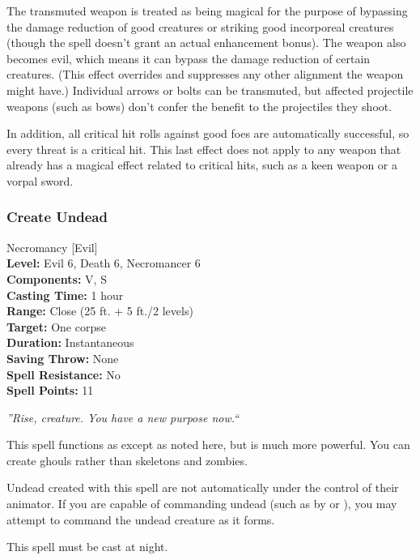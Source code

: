 The transmuted weapon is treated as being magical for the purpose of bypassing the damage reduction of good creatures or striking good incorporeal creatures (though the spell doesn't grant an actual enhancement bonus). 
The weapon also becomes evil, which means it can bypass the damage reduction of certain creatures. (This effect overrides and suppresses any other alignment the weapon might have.) 
Individual arrows or bolts can be transmuted, but affected projectile weapons (such as bows) don't confer the benefit to the projectiles they shoot.

In addition, all critical hit rolls against good foes are automatically successful, so every threat is a critical hit. 
This last effect does not apply to any weapon that already has a magical effect related to critical hits, such as a keen weapon or a vorpal sword.
\subsubsection{Create Undead}
\label{Spell:CreateUndead}
Necromancy [Evil]
\\ \textbf{Level:} Evil 6, Death 6, Necromancer 6
\\ \textbf{Components:} V, S
\\ \textbf{Casting Time:} 1 hour
\\ \textbf{Range:} Close (25 ft. + 5 ft./2 levels)
\\ \textbf{Target:} One corpse
\\ \textbf{Duration:} Instantaneous
\\ \textbf{Saving Throw:} None
\\ \textbf{Spell Resistance:} No
\\ \textbf{Spell Points:} 11

\emph{''Rise, creature. You have a new purpose now.``}

This spell functions as  except as noted here, but is much more powerful. You can create ghouls rather than skeletons and zombies.

Undead created with this spell are not automatically under the control of their animator.
If you are capable of commanding undead (such as by  or ), you may attempt to command the undead creature as it forms.

This spell must be cast at night. 

